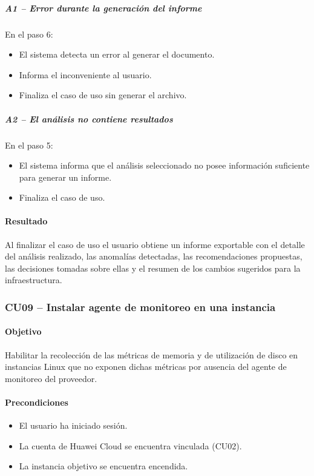 \subparagraph{A1 -- Error durante la generación del informe}

En el paso 6:

\begin{itemize}
\item El sistema detecta un error al generar el documento.
\item Informa el inconveniente al usuario.
\item Finaliza el caso de uso sin generar el archivo.
\end{itemize}

\subparagraph{A2 -- El análisis no contiene resultados}

En el paso 5:

\begin{itemize}
\item El sistema informa que el análisis seleccionado no posee información suficiente para generar un informe.
\item Finaliza el caso de uso.
\end{itemize}

\paragraph*{Resultado}

Al finalizar el caso de uso el usuario obtiene un informe exportable con el detalle del análisis realizado, las anomalías detectadas, las recomendaciones propuestas, las decisiones tomadas sobre ellas y el resumen de los cambios sugeridos para la infraestructura.

\subsubsection{CU09 -- Instalar agente de monitoreo en una instancia}

\paragraph*{Objetivo}

Habilitar la recolección de las métricas de memoria y de utilización de disco en instancias Linux que no exponen dichas métricas por ausencia del agente de monitoreo del proveedor.

\paragraph*{Precondiciones}

\begin{itemize}
\item El usuario ha iniciado sesión.
\item La cuenta de Huawei Cloud se encuentra vinculada (CU02).
\item La instancia objetivo se encuentra encendida.
\end{itemize}

